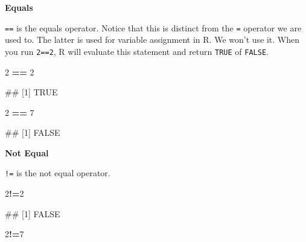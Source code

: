 \documentclass[
]{book}
\newenvironment{Shaded}{\begin{snugshade}}{\end{snugshade}}
\newcommand{\DecValTok}[1]{\textcolor[rgb]{0.00,0.00,0.81}{#1}}
\newcommand{\NormalTok}[1]{#1}
\newcommand{\SpecialCharTok}[1]{\textcolor[rgb]{0.81,0.36,0.00}{\textbf{#1}}}
\begin{document}
\textbf{Equals}

\texttt{==} is the equals operator. Notice that this is distinct from the \texttt{=} operator we are used to. The latter is used for variable assignment in R. We won't use it. When you run \texttt{2==2}, R will evaluate this statement and return \texttt{TRUE} of \texttt{FALSE}.

\begin{Shaded}
\begin{Highlighting}[]
\DecValTok{2} \SpecialCharTok{==} \DecValTok{2}
\end{Highlighting}
\end{Shaded}

\begin{Shaded}
\begin{Highlighting}[]
\NormalTok{\#\# [1] TRUE}
\end{Highlighting}
\end{Shaded}

\begin{Shaded}
\begin{Highlighting}[]
\DecValTok{2} \SpecialCharTok{==} \DecValTok{7}
\end{Highlighting}
\end{Shaded}

\begin{Shaded}
\begin{Highlighting}[]
\NormalTok{\#\# [1] FALSE}
\end{Highlighting}
\end{Shaded}

\textbf{Not Equal}

\texttt{!=} is the not equal operator.

\begin{Shaded}
\begin{Highlighting}[]
\DecValTok{2}\SpecialCharTok{!=}\DecValTok{2}
\end{Highlighting}
\end{Shaded}

\begin{Shaded}
\begin{Highlighting}[]
\NormalTok{\#\# [1] FALSE}
\end{Highlighting}
\end{Shaded}

\begin{Shaded}
\begin{Highlighting}[]
\DecValTok{2}\SpecialCharTok{!=}\DecValTok{7}
\end{Highlighting}
\end{Shaded}
\end{document}
